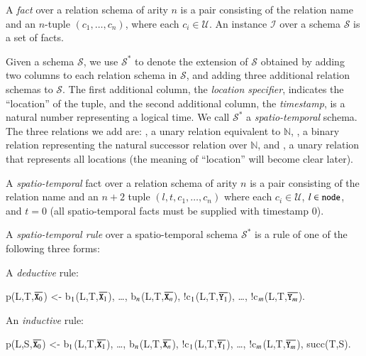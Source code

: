 
A {\em fact} over a relation schema of arity $n$ is a pair consisting of the relation name and an $n$-tuple $(c_1,\ldots,c_n)$, where each $c_i \in \mathcal{U}$.  An instance $\mathcal{I}$ over a schema $\mathcal{S}$ is a set of facts.

Given a schema $\mathcal{S}$, we use $\mathcal{S}^*$ to denote the extension of $\mathcal{S}$ obtained by adding two columns to each relation schema in $\mathcal{S}$, and adding three additional relation schemas to $\mathcal{S}$.  The first additional column, the {\em location specifier}, indicates the ``location'' of the tuple, and the second additional column, the {\em timestamp}, is a natural number representing a logical time.   We call $\mathcal{S}^*$ a {\em spatio-temporal} schema.  The three relations we add are: , a unary relation equivalent to $\mathbb{N}$, , a binary relation representing the natural successor relation over $\mathbb{N}$, and , a unary relation that represents all locations (the meaning of ``location'' will become clear later).

A {\em spatio-temporal} fact over a relation schema of arity $n$ is a pair consisting of the relation name and an $n+2$ tuple $(l,t,c_1,\ldots,c_n)$ where each $c_i \in \mathcal{U}$, $l \in \dedalus{node}$, and $t = 0$ (all spatio-temporal facts must be supplied with timestamp 0).

A {\em spatio-temporal rule} over a spatio-temporal schema $\mathcal{S}^*$ is a rule of one of the following three forms:


A {\em deductive} rule:

\begin{Dedalus}
p(L,T,\(\overline{\dedalus{X}\sb{0}}\)) <- b\(\sb{1}\)(L,T,\(\overline{\dedalus{X}\sb{1}}\)), \ldots, b\(\sb{n}\)(L,T,\(\overline{\dedalus{X}\sb{n}}\)),
!c\(\sb{1}\)(L,T,\(\overline{\dedalus{Y}\sb{1}}\)), \ldots, !c\(\sb{m}\)(L,T,\(\overline{\dedalus{Y}\sb{m}}\)).
\end{Dedalus}

An {\em inductive} rule:

\begin{Dedalus}
p(L,S,\(\overline{\dedalus{X}\sb{0}}\)) <- b\(\sb{1}\)(L,T,\(\overline{\dedalus{X}\sb{1}}\)), \ldots, b\(\sb{n}\)(L,T,\(\overline{\dedalus{X}\sb{n}}\)),
!c\(\sb{1}\)(L,T,\(\overline{\dedalus{Y}\sb{1}}\)), \ldots, !c\(\sb{m}\)(L,T,\(\overline{\dedalus{Y}\sb{m}}\)), succ(T,S).
\end{Dedalus}

